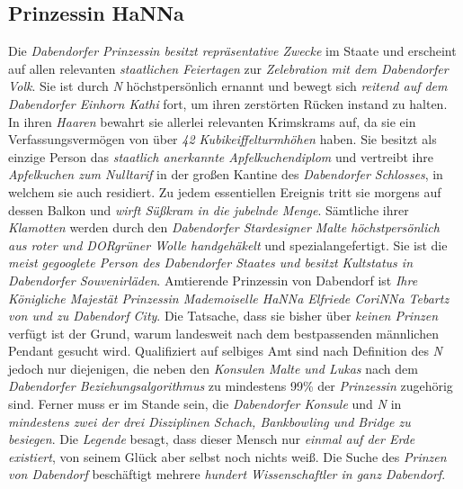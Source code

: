 \subsection{{Prinzessin HaNNa}}
Die \textit{Dabendorfer Prinzessin besitzt repräsentative Zwecke} im Staate und erscheint auf allen relevanten \textit{staatlichen Feiertagen} zur \textit{Zelebration mit dem Dabendorfer Volk}. Sie ist durch \textit{N} höchstpersönlich ernannt und bewegt sich \textit{reitend auf dem Dabendorfer Einhorn Kathi} fort, um ihren zerstörten Rücken instand zu halten. In ihren \textit{Haaren} bewahrt sie allerlei relevanten Krimskrams auf, da sie ein Verfassungsvermögen von über \textit{42 Kubikeiffelturmhöhen} haben. Sie besitzt als einzige Person das \textit{staatlich anerkannte Apfelkuchendiplom} und vertreibt ihre \textit{Apfelkuchen zum Nulltarif} in der großen Kantine des \textit{Dabendorfer Schlosses}, in welchem sie auch residiert. Zu jedem essentiellen Ereignis tritt sie morgens auf dessen Balkon und \textit{wirft Süßkram in die jubelnde Menge}. Sämtliche ihrer \textit{Klamotten} werden durch den \textit{Dabendorfer Stardesigner Malte höchstpersönlich aus roter und DORgrüner Wolle handgehäkelt} und spezialangefertigt. Sie ist die \textit{meist gegooglete Person des Dabendorfer Staates und besitzt Kultstatus in Dabendorfer Souvenirläden}. Amtierende Prinzessin von Dabendorf ist \textit{Ihre Königliche Majestät Prinzessin Mademoiselle HaNNa Elfriede CoriNNa Tebartz von und zu Dabendorf City}. Die Tatsache, dass sie bisher über \textit{keinen Prinzen} verfügt ist der Grund, warum landesweit nach dem bestpassenden männlichen Pendant gesucht wird. Qualifiziert auf selbiges Amt sind nach Definition des \textit{N} jedoch nur diejenigen, die neben den \textit{Konsulen Malte und Lukas} nach dem \textit{Dabendorfer Beziehungsalgorithmus} zu mindestens 99\% der \textit{Prinzessin} zugehörig sind. Ferner muss er im Stande sein, die \textit{Dabendorfer Konsule} und \textit{N} in \textit{mindestens zwei der drei Disziplinen Schach, Bankbowling und Bridge zu besiegen}. Die \textit{Legende} besagt, dass dieser Mensch nur \textit{einmal auf der Erde existiert}, von seinem Glück aber selbst noch nichts weiß. Die Suche des \textit{Prinzen von Dabendorf} beschäftigt mehrere \textit{hundert Wissenschaftler in ganz Dabendorf}.

\clearpage


